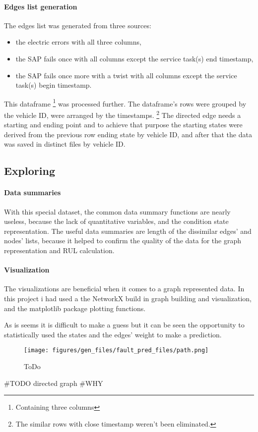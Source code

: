 \paragraph{Edges list generation}
The edges list was generated from three sources: 
\begin{itemize}
	\item{the electric errors} with all three columns,
	\item{the SAP fails once} with all columns except the service task(s) end timestamp,
	\item{the SAP fails once more with a twist} with all columns except the service task(s) begin timestamp.
\end{itemize}

This dataframe \footnote{Containing three columns} was processed further. The dataframe's rows were grouped by the vehicle ID, were arranged by the timestamps.
\footnote{The similar rows with close timestamp weren't been eliminated.}
The directed edge needs a starting and ending point and to achieve that purpose the starting states were derived from the previous row ending state by vehicle ID, and after that the data was saved in distinct files by vehicle ID.
	\subsection{Exploring}
		\paragraph{Data summaries}
		With this special dataset, the common data summary functions are nearly useless, because the lack of quantitative variables, and the condition state representation.
		The useful data summaries are length of the dissimilar edges' and nodes' lists, because it helped to confirm the quality of the data for the graph representation and RUL calculation. 

		\paragraph{Visualization}
		The visualizations are beneficial when it comes to a graph represented data. In this project i had used a the NetworkX build in graph building and visualization, and the matplotlib package plotting functions.

		As is seems it is difficult to make a guess but it can be seen the opportunity to statistically used the states and the edges' weight to make a prediction.
			\begin{figure}[H]
			\centering
			\texttt{[image: figures/gen\_files/fault\_pred\_files/path.png]}
			\caption{ToDo} 
			\end{figure}
		\#TODO directed graph
\#WHY


